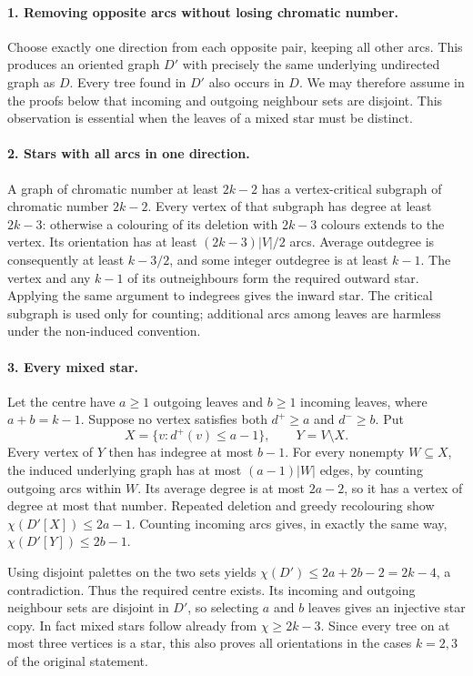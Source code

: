 \documentclass[11pt,a4paper]{article}
\begin{document}
\paragraph{1. Removing opposite arcs without losing chromatic number.}
Choose exactly one direction from each opposite pair, keeping all
other arcs. This produces an oriented graph $D'$ with precisely the
same underlying undirected graph as $D$. Every tree found in $D'$
also occurs in $D$. We may therefore assume in the proofs below that
incoming and outgoing neighbour sets are disjoint. This observation
is essential when the leaves of a mixed star must be distinct.

\paragraph{2. Stars with all arcs in one direction.}
A graph of chromatic number at least $2k-2$ has a vertex-critical
subgraph of chromatic number $2k-2$. Every vertex of that subgraph
has degree at least $2k-3$: otherwise a colouring of its deletion
with $2k-3$ colours extends to the vertex. Its orientation has at
least $(2k-3)|V|/2$ arcs. Average outdegree is consequently at least
$k-3/2$, and some integer outdegree is at least $k-1$. The vertex and
any $k-1$ of its outneighbours form the required outward star.
Applying the same argument to indegrees gives the inward star.
The critical subgraph is used only for counting; additional arcs
among leaves are harmless under the non-induced convention.

\paragraph{3. Every mixed star.}
Let the centre have $a\ge1$ outgoing leaves and $b\ge1$ incoming
leaves, where $a+b=k-1$. Suppose no vertex satisfies both
$d^+\ge a$ and $d^-\ge b$. Put
\[
 X=\{v:d^+(v)\le a-1\},\qquad Y=V\setminus X.
\]
Every vertex of $Y$ then has indegree at most $b-1$. For every
nonempty $W\subseteq X$, the induced underlying graph has at most
$(a-1)|W|$ edges, by counting outgoing arcs within $W$. Its average
degree is at most $2a-2$, so it has a vertex of degree at most that
number. Repeated deletion and greedy recolouring show
$\chi(D'[X])\le2a-1$. Counting incoming arcs gives, in exactly the
same way, $\chi(D'[Y])\le2b-1$.

Using disjoint palettes on the two sets yields
$\chi(D')\le2a+2b-2=2k-4$, a contradiction. Thus the required centre
exists. Its incoming and outgoing neighbour sets are disjoint in
$D'$, so selecting $a$ and $b$ leaves gives an injective star copy.
In fact mixed stars follow already from $\chi\ge2k-3$. Since every
tree on at most three vertices is a star, this also proves all
orientations in the cases $k=2,3$ of the original statement.
\end{document}
